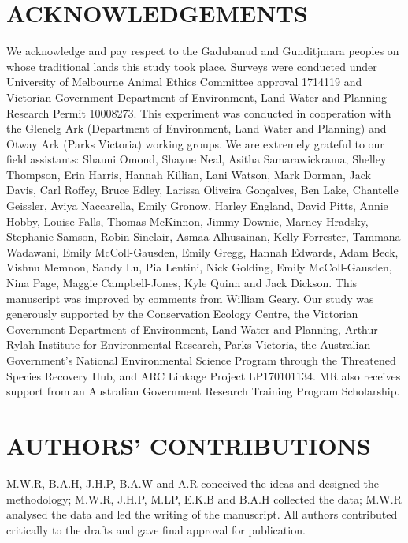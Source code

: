 \documentclass[]{elsarticle} %
\begin{document}
\newpage

\hypertarget{acknowledgements}{%
\section{ACKNOWLEDGEMENTS}\label{acknowledgements}}

We acknowledge and pay respect to the Gadubanud and Gunditjmara peoples on whose traditional lands this study took place. Surveys were conducted under University of Melbourne Animal Ethics Committee approval 1714119 and Victorian Government Department of Environment, Land Water and Planning Research Permit 10008273. This experiment was conducted in cooperation with the Glenelg Ark (Department of Environment, Land Water and Planning) and Otway Ark (Parks Victoria) working groups. We are extremely grateful to our field assistants: Shauni Omond, Shayne Neal, Asitha Samarawickrama, Shelley Thompson, Erin Harris, Hannah Killian, Lani Watson, Mark Dorman, Jack Davis, Carl Roffey, Bruce Edley, Larissa Oliveira Gonçalves, Ben Lake, Chantelle Geissler, Aviya Naccarella, Emily Gronow, Harley England, David Pitts, Annie Hobby, Louise Falls, Thomas McKinnon, Jimmy Downie, Marney Hradsky, Stephanie Samson, Robin Sinclair, Asmaa Alhusainan, Kelly Forrester, Tammana Wadawani, Emily McColl-Gausden, Emily Gregg, Hannah Edwards, Adam Beck, Vishnu Memnon, Sandy Lu, Pia Lentini, Nick Golding, Emily McColl-Gausden, Nina Page, Maggie Campbell-Jones, Kyle Quinn and Jack Dickson. This manuscript was improved by comments from William Geary. Our study was generously supported by the Conservation Ecology Centre, the Victorian Government Department of Environment, Land Water and Planning, Arthur Rylah Institute for Environmental Research, Parks Victoria, the Australian Government's National Environmental Science Program through the Threatened Species Recovery Hub, and ARC Linkage Project LP170101134. MR also receives support from an Australian Government Research Training Program Scholarship.

\hypertarget{authors-contributions}{%
\section{AUTHORS' CONTRIBUTIONS}\label{authors-contributions}}

M.W.R, B.A.H, J.H.P, B.A.W and A.R conceived the ideas and designed the methodology; M.W.R, J.H.P, M.LP, E.K.B and B.A.H collected the data; M.W.R analysed the data and led the writing of the manuscript. All authors contributed critically to the drafts and gave final approval for publication.
\end{document}
